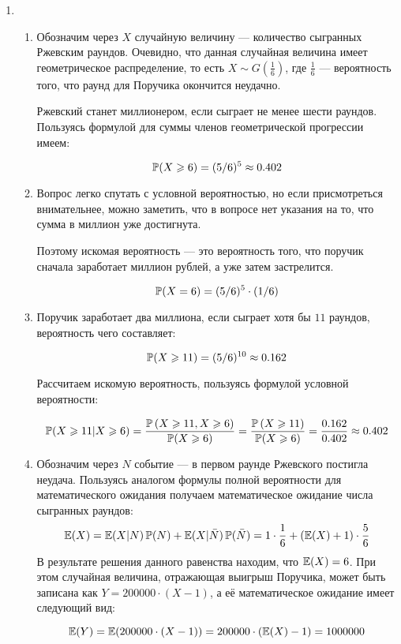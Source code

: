 \begin{enumerate}
	\item 
	\begin{enumerate}
		\item Обозначим через $X$ случайную величину — количество сыгранных Ржевским раундов. Очевидно, что данная случайная величина имеет геометрическое распределение, то есть $X\sim G(\frac{1}{6})$, где $\frac{1}{6}$ — вероятность того, что раунд для Поручика окончится неудачно.
		
		Ржевский станет миллионером, если сыграет не менее шести раундов. Пользуясь формулой для суммы членов геометрической прогрессии имеем:
		
		\[
		\P(X\geq 6)=(5/6)^5 \approx 0.402
		\]
		
		\item Вопрос легко спутать с условной вероятностью, но если присмотреться внимательнее,
		можно заметить, что в вопросе нет указания на то, что сумма в миллион уже достигнута. 

		Поэтому искомая вероятность — это вероятность того, что поручик сначала заработает миллион рублей,
		а уже затем застрелится. 

		\[
		\P(X = 6) = (5/6)^5 \cdot (1/6)	
		\]
		
		\item
		Поручик заработает два миллиона, если сыграет хотя бы $11$ раундов, вероятность чего составляет:
		
		\[
		\P(X\geq 11)=(5/6)^{10} \approx0.162
		\]
		
		Рассчитаем искомую вероятность, пользуясь формулой условной вероятности:
		
		\[
		\P(X\geq 11|X\geq 6)=\frac{\P\left(X\geq 11, X\geq 6\right)}{\P(X\geq 6)}=\frac{\P\left(X\geq 11\right)}{\P(X\geq 6)}=\frac{0.162}{0.402}\approx 0.402
		\]
		
			
		\item Обозначим через $N$ событие — в первом раунде Ржевского постигла неудача. Пользуясь аналогом формулы полной вероятности для математического ожидания получаем математическое ожидание числа сыгранных раундов:
		\[
		\E(X)=\E(X|N)\P(N)+\E(X|\bar{N})\P(\bar{N})=1\cdot \frac{1}{6}+(\E(X)+1)\cdot \frac{5}{6}
		\]
	В результате решения данного равенства находим, что $\E(X)=6$. При этом случайная величина, отражающая выигрыш Поручика, может быть записана как $Y=200000\cdot (X-1)$, а её математическое ожидание имеет следующий вид:
	
	\[
	\E(Y)=\E(200000\cdot (X-1))=200000\cdot (\E(X)-1)=1000000
	\]
	

\end{enumerate}
\end{enumerate}
